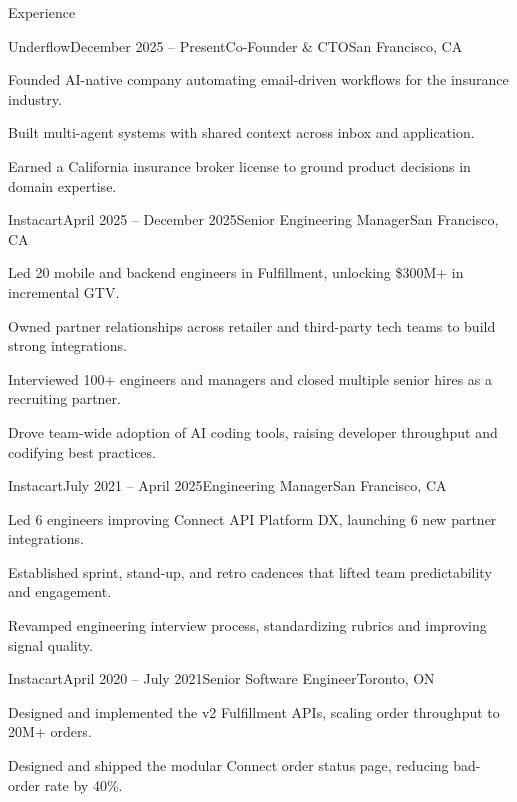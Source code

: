 \documentclass{resume} %
\begin{document}
\begin{rSection}{Experience}

\begin{rSubsection}{Underflow}{December 2025 -- Present}{Co-Founder \& CTO}{San Francisco, CA}
\item Founded AI-native company automating email-driven workflows for the insurance industry.
\item Built multi-agent systems with shared context across inbox and application.
\item Earned a California insurance broker license to ground product decisions in domain expertise.
\end{rSubsection}


\begin{rSubsection}{Instacart}{April 2025 -- December 2025}{Senior Engineering Manager}{San Francisco, CA}
\item Led 20 mobile and backend engineers in Fulfillment, unlocking \$300M+ in incremental GTV.
\item Owned partner relationships across retailer and third-party tech teams to build strong integrations.
\item Interviewed 100+ engineers and managers and closed multiple senior hires as a recruiting partner.
\item Drove team-wide adoption of AI coding tools, raising developer throughput and codifying best practices.
\end{rSubsection}


\begin{rSubsection}{Instacart}{July 2021 -- April 2025}{Engineering Manager}{San Francisco, CA}
\item Led 6 engineers improving Connect API Platform DX, launching 6 new partner integrations.
\item Established sprint, stand-up, and retro cadences that lifted team predictability and engagement.
\item Revamped engineering interview process, standardizing rubrics and improving signal quality.
\end{rSubsection}


\begin{rSubsection}{Instacart}{April 2020 -- July 2021}{Senior Software Engineer}{Toronto, ON}
\item Designed and implemented the v2 Fulfillment APIs, scaling order throughput to 20M+ orders.
\item Designed and shipped the modular Connect order status page, reducing bad-order rate by 40\%.
\end{rSubsection}


\end{rSection}
\end{document}
